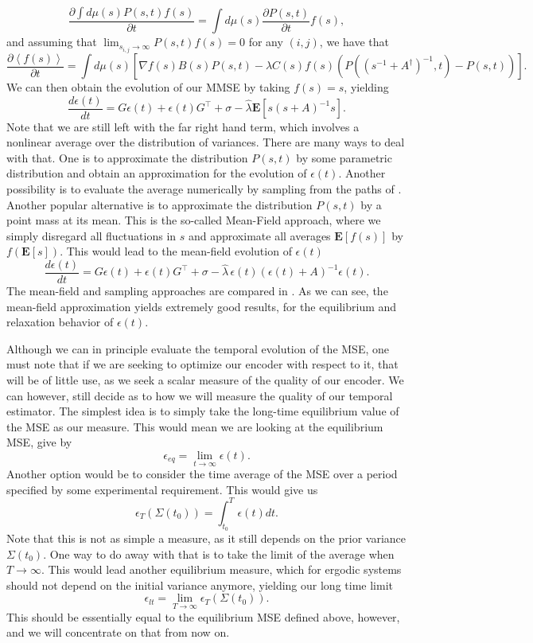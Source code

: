 \[
\frac{\partial \int d\mu(s) P(s,t) f(s)}{\partial t} = \int d\mu(s) \frac{\partial P(s,t)}{\partial t} f(s),
\]
and assuming that $\lim_{s_{i,j} \to \infty} P(s,t) f(s) = 0$ for any $(i,j)$, we have that
\[
\frac{\partial \left<f(s)\right>}{\partial t} = \int d\mu(s) \left[\nabla f(s) B(s) P(s,t) - \lambda C(s) f(s) \left(P((s^{-1} + A^\dagger)^{-1},t)  -P(s,t)\right)\right].
\]
We can then obtain the evolution of our MMSE by taking $f(s) = s$, yielding
\begin{equation}
\label{eq:epsilon_exact}
\frac{d\epsilon(t)}{dt} = G\epsilon(t) + \epsilon(t) G^\top + \sigma -\hat{\lambda} \boldsymbol{E}\left[s (s+A)^{-1} s\right].
\end{equation}
Note that we are still left with the far right hand term, which involves a nonlinear average over the distribution of variances. There are many ways to deal with that. One is to approximate the distribution $P(s,t)$ by some parametric distribution and obtain an approximation for the evolution of $\epsilon(t)$. Another possibility is to evaluate the average numerically by sampling from the paths of . Another popular alternative is to approximate the distribution $P(s,t)$ by a point mass at its mean. This is the so-called Mean-Field approach, where we simply disregard all fluctuations in $s$ and approximate all averages $\boldsymbol{E}[f(s)]$ by $f(\boldsymbol{E}[s])$. This would lead to the mean-field evolution of $\epsilon(t)$
\begin{equation}
\frac{d\epsilon(t)}{dt} = G\epsilon(t) + \epsilon(t) G^\top + \sigma -\hat{\lambda} \,\epsilon(t) \left(\epsilon(t)+A\right)^{-1} \epsilon(t).
\end{equation}
The mean-field and sampling approaches are compared in . As we can see, the mean-field approximation yields extremely good results, for the equilibrium and relaxation behavior of $\epsilon(t)$.\par
Although we can in principle evaluate the temporal evolution of the MSE, one must note that if we are seeking to optimize our encoder with respect to it, that will be of little use, as we seek a scalar measure of the quality of our encoder. We can however, still decide as to how we will measure the quality of our temporal estimator. The simplest idea is to simply take the long-time equilibrium value of the MSE as our measure. This would mean we are looking at the equilibrium MSE, give by
\[
\epsilon_{eq} = \lim_{t\to\infty} \epsilon(t).
\]
Another option would be to consider the time average of the MSE over a period specified by some experimental requirement. This would give us
\[
\epsilon_{T}\left(\Sigma(t_0)\right) = \int_{t_0}^T \epsilon(t) dt.
\]
Note that this is not as simple a measure, as it still depends on the prior variance $\Sigma(t_0)$. One way to do away with that is to take the limit of the average when $T\to\infty$. This would lead another equilibrium measure, which for ergodic systems should not depend on the initial variance anymore, yielding our long time limit
\[
\epsilon_{lt} = \lim_{T\to\infty}\epsilon_T \left(\Sigma(t_0)\right).
\]
This should be essentially equal to the equilibrium MSE defined above, however, and we will concentrate on that from now on.
\par
